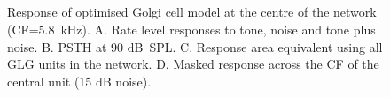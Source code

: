 \begin{figure}[htb]
  \centering
  \hfill{}\hfill\\
  \\
  \hfill{}\hfill\\
  \\
\caption[Optimised Golgi cell model responses]{Response of optimised Golgi cell model at the centre of the network (CF=5.8~kHz). A. Rate level responses to tone, noise and tone plus noise. B. PSTH at 90 dB~SPL.  C. Response area equivalent using all GLG units in the network. D. Masked response across the CF of the central unit (15 dB noise).} \label{fig:Golgi_verification}
\end{figure}









